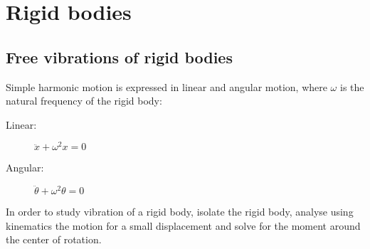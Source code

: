 \documentclass[10pt, twocolumn]{article}
\begin{document}
\section{Rigid bodies}
\subsection{Free vibrations of rigid bodies}
Simple harmonic motion is expressed in linear and angular motion, where \(\omega\) is the natural frequency of the rigid body:
\begin{description}
  \item[Linear:] \(\ddot{x} + \omega^2 x = 0\)
  \item[Angular:] \(\ddot{\theta} + \omega^2 \theta = 0\)
\end{description}

In order to study vibration of a rigid body, isolate the rigid body, analyse using kinematics the motion for a small displacement and solve for the moment around the center of rotation.
\end{document}
